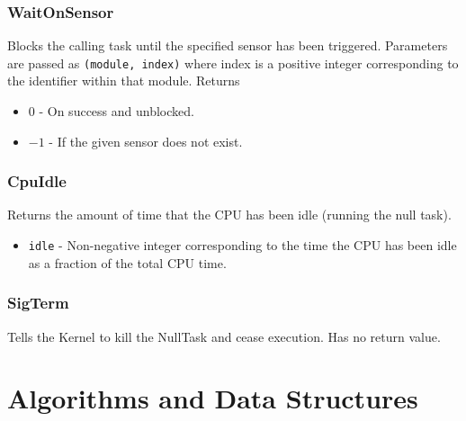 \documentclass[12pt]{article}
\begin{document}
\subsubsection{WaitOnSensor}
Blocks the calling task until the specified sensor has been triggered.  Parameters are passed as \texttt{(module, index)} where index is a positive integer corresponding to the identifier within that module.  Returns
\begin{itemize}
  \item $0$ - On success and unblocked.
  \item $-1$ - If the given sensor does not exist.
    \\
\end{itemize}
\subsubsection{CpuIdle}
Returns the amount of time that the CPU has been idle (running the null task).
\begin{itemize}
  \item \texttt{idle} - Non-negative integer corresponding to the time the CPU has been idle as a fraction of the total CPU time.
    \\
\end{itemize}
\subsubsection{SigTerm}
Tells the Kernel to kill the NullTask and cease execution.  Has no return value.
\\[2\baselineskip]
\section{Algorithms and Data Structures}
\end{document}
